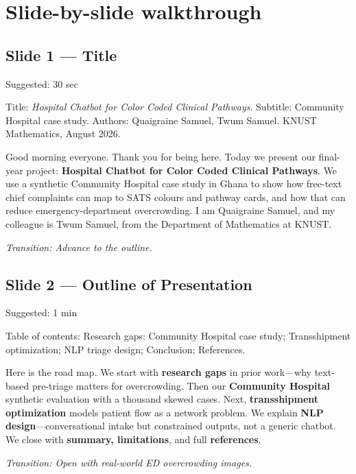 \documentclass[11pt]{article}
\newcommand{\transition}[1]{\medskip\noindent\textit{\textcolor{knustMuted}{Transition: #1}}\medskip}
\newcommand{\deck}[1]{{\small\texttt{\textcolor{knustMuted}{main.pdf slide: #1}}}}
\newcommand{\slide}[3]{%
  \subsection{Slide #1 --- #2}%
  \noindent\deck{#1 --- #3}\par\smallskip}
\begin{document}
\newpage
\section{Slide-by-slide walkthrough}

\slide{1}{Title}{Opening}
\begin{timing}Suggested: 30 sec\end{timing}
\begin{onscreen}
Title: \emph{Hospital Chatbot for Color Coded Clinical Pathways}. Subtitle: Community Hospital case study.
Authors: Quaigraine Samuel, Twum Samuel. KNUST Mathematics, August 2026.
\end{onscreen}
\begin{saybox}
Good morning everyone. Thank you for being here. Today we present our final-year project:
\textbf{Hospital Chatbot for Color Coded Clinical Pathways}. We use a synthetic Community Hospital
case study in Ghana to show how free-text chief complaints can map to SATS colours and pathway cards,
and how that can reduce emergency-department overcrowding. I am Quaigraine Samuel, and my colleague
is Twum Samuel, from the Department of Mathematics at KNUST.
\end{saybox}
\transition{Advance to the outline.}

\slide{2}{Outline of Presentation}{Opening}
\begin{timing}Suggested: 1 min\end{timing}
\begin{onscreen}
Table of contents: Research gaps; Community Hospital case study; Transshipment optimization;
NLP triage design; Conclusion; References.
\end{onscreen}
\begin{saybox}
Here is the road map. We start with \textbf{research gaps} in prior work---why text-based pre-triage
matters for overcrowding. Then our \textbf{Community Hospital} synthetic evaluation with a thousand
skewed cases. Next, \textbf{transshipment optimization} models patient flow as a network problem.
We explain \textbf{NLP design}---conversational intake but constrained outputs, not a generic chatbot.
We close with \textbf{summary, limitations}, and full \textbf{references}.
\end{saybox}
\transition{Open with real-world ED overcrowding images.}
\end{document}
